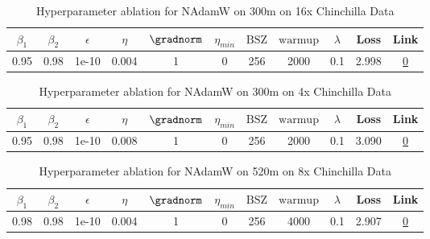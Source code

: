\begin{table}[H]
\centering
\caption{Hyperparameter ablation for NAdamW on 300m on 16x Chinchilla Data}
\label{tab:ablation_nadamw_300m_16}
\begin{tabular}{ccccccccccc}
\toprule
$\beta_1$ & $\beta_2$ & $\epsilon$ & $\eta$ & $\gradnorm$ & $\eta_{min}$ & $\mathrm{BSZ}$ & $\mathrm{warmup}$ & $\lambda$ & Loss & Link \\
\midrule
0.95 & 0.98 & 1e-10 & 0.004 & 1 & 0 & 256 & 2000 & 0.1 & 2.998 & \href{https://wandb.ai/stanford-mercury/optimizer-scaling/runs/sweep-300m-96B-nadamw860e52lr0.004-wd0.1-minlr0-warmup2000-b10.9-8d9fe1}{0} \\
\midrule
\bottomrule
\end{tabular}
\end{table}

\begin{table}[H]
\centering
\caption{Hyperparameter ablation for NAdamW on 300m on 4x Chinchilla Data}
\label{tab:ablation_nadamw_300m_4}
\begin{tabular}{ccccccccccc}
\toprule
$\beta_1$ & $\beta_2$ & $\epsilon$ & $\eta$ & $\gradnorm$ & $\eta_{min}$ & $\mathrm{BSZ}$ & $\mathrm{warmup}$ & $\lambda$ & Loss & Link \\
\midrule
0.95 & 0.98 & 1e-10 & 0.008 & 1 & 0 & 256 & 2000 & 0.1 & 3.090 & \href{https://wandb.ai/stanford-mercury/optimizer-scaling/runs/sweep-300m-24B-nadamwd89df2lr0.008-wd0.1-minlr0-warmup2000-b10.9-c667e7}{0} \\
\midrule
\bottomrule
\end{tabular}
\end{table}

\begin{table}[H]
\centering
\caption{Hyperparameter ablation for NAdamW on 520m on 8x Chinchilla Data}
\label{tab:ablation_nadamw_520m_8}
\begin{tabular}{ccccccccccc}
\toprule
$\beta_1$ & $\beta_2$ & $\epsilon$ & $\eta$ & $\gradnorm$ & $\eta_{min}$ & $\mathrm{BSZ}$ & $\mathrm{warmup}$ & $\lambda$ & Loss & Link \\
\midrule
0.98 & 0.98 & 1e-10 & 0.004 & 1 & 0 & 256 & 4000 & 0.1 & 2.907 & \href{https://wandb.ai/stanford-mercury/optimizer-scaling/runs/sweep-520m-85B-nadamwcf9d95lr0.004-wd0.1-minlr0-warmup4000-b10.9-d09912}{0} \\
\midrule
\bottomrule
\end{tabular}
\end{table}

